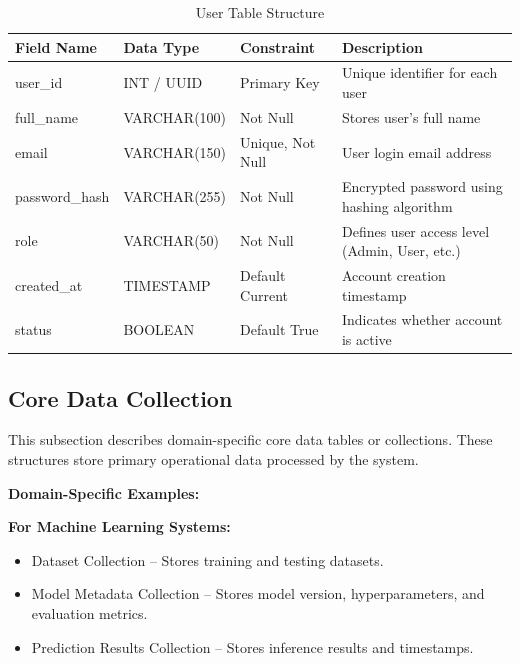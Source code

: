\begin{table}[h]
\centering
\caption{User Table Structure}

\begin{tabularx}{\textwidth}{|p{3cm}|p{3cm}|p{3cm}|X|}
\hline
\textbf{Field Name} & \textbf{Data Type} & \textbf{Constraint} & \textbf{Description} \\
\hline
user\_id & INT / UUID & Primary Key & Unique identifier for each user \\
\hline
full\_name & VARCHAR(100) & Not Null & Stores user’s full name \\
\hline
email & VARCHAR(150) & Unique, Not Null & User login email address \\
\hline
password\_hash & VARCHAR(255) & Not Null & Encrypted password using hashing algorithm \\
\hline
role & VARCHAR(50) & Not Null & Defines user access level (Admin, User, etc.) \\
\hline
created\_at & TIMESTAMP & Default Current & Account creation timestamp \\
\hline
status & BOOLEAN & Default True & Indicates whether account is active \\
\hline
\end{tabularx}

\end{table}



\subsection{Core Data Collection}

This subsection describes domain-specific core data tables or collections. These structures store primary operational data processed by the system.

\textbf{Domain-Specific Examples:}

\textbf{For Machine Learning Systems:}
\begin{itemize}
    \item Dataset Collection – Stores training and testing datasets.
    \item Model Metadata Collection – Stores model version, hyperparameters, and evaluation metrics.
    \item Prediction Results Collection – Stores inference results and timestamps.
\end{itemize}

